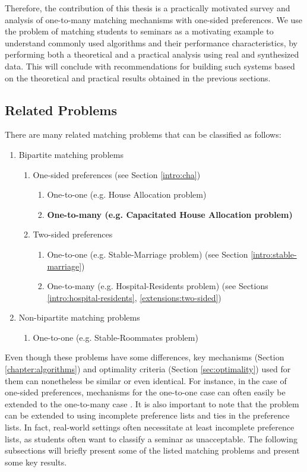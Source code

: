 Therefore, the contribution of this thesis is a practically motivated survey and analysis of one-to-many matching mechanisms with one-sided preferences. We use the problem of matching students to seminars as a motivating example to understand commonly used algorithms and their performance characteristics, by performing both a theoretical and a practical analysis using real and synthesized data. This will conclude with recommendations for building such systems based on the theoretical and practical results obtained in the previous sections. 

\subsection{Related Problems}
There are many related matching problems that can be classified as follows:
\begin{enumerate}
    \item Bipartite matching problems
    \begin{enumerate}
        \item One-sided preferences (see Section \ref{intro:cha})
        \begin{enumerate}
            \item One-to-one (e.g. House Allocation problem)
            \item \textbf{One-to-many (e.g. Capacitated House Allocation problem)} 
        \end{enumerate}
        \item Two-sided preferences
        \begin{enumerate}
            \item One-to-one (e.g. Stable-Marriage problem) (see Section \ref{intro:stable-marriage})
            \item One-to-many (e.g. Hospital-Residents problem) (see Sections \ref{intro:hospital-residents}, \ref{extensions:two-sided})
        \end{enumerate}
    \end{enumerate}
    \item Non-bipartite matching problems 
    \begin{enumerate}
        \item One-to-one (e.g. Stable-Roommates problem)
    \end{enumerate}
\end{enumerate}
Even though these problems have some differences, key mechanisms (Section \ref{chapter:algorithms}) and optimality criteria (Section \ref{sec:optimality}) used for them can nonetheless be similar or even identical. For instance, in the case of one-sided preferences, mechanisms for the one-to-one case can often easily be extended to the one-to-many case \cite{Gusfield}. It is also important to note that the problem can be extended to using incomplete preference lists and ties in the preference lists. In fact, real-world settings often necessitate at least incomplete preference lists, as students often want to classify a seminar as unacceptable. The following subsections will briefly present some of the listed matching problems and present some key results.  

